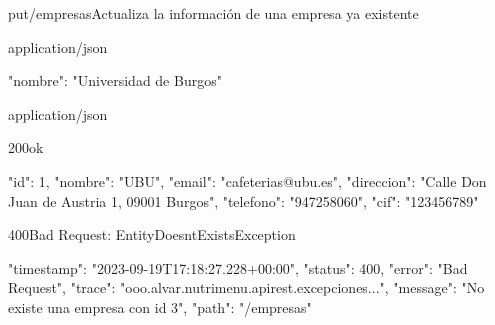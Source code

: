 \begin{apiRoute}{put}{/empresas}{Actualiza la información de una empresa ya existente}
	\begin{routeParameter}
	\end{routeParameter}
	
	\begin{routeRequest}{application/json}
		\begin{routeRequestBody}
{
	"nombre": "Universidad de Burgos"
}
		\end{routeRequestBody}
	\end{routeRequest}
	\begin{routeResponse}{application/json}
		\begin{routeResponseItem}{200}{ok}
			\begin{routeResponseItemBody}
{
	"id": 1,
	"nombre": "UBU",
	"email": "cafeterias@ubu.es",
	"direccion": "Calle Don Juan de Austria 1, 09001 Burgos",
	"telefono": "947258060",
	"cif": "123456789"
}
			\end{routeResponseItemBody}
		\end{routeResponseItem}
		\begin{routeResponseItem}{400}{Bad Request: EntityDoesntExistsException}
			\begin{routeResponseItemBody}
{
    "timestamp": "2023-09-19T17:18:27.228+00:00",
    "status": 400,
    "error": "Bad Request",
    "trace": "ooo.alvar.nutrimenu.apirest.excepciones...",
    "message": "No existe una empresa con id 3",
    "path": "/empresas"
}
			\end{routeResponseItemBody}
		\end{routeResponseItem}
	\end{routeResponse}
\end{apiRoute}

